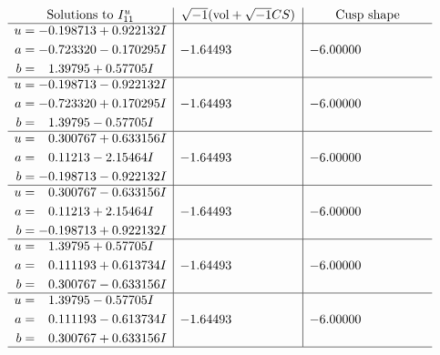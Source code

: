\documentclass[1p]{elsarticle_modified}
\theoremstyle{definition}
\newcommand{\I}{\sqrt{-1}}
\begin{document}
$$\begin{array}{c|c|c}  
\text{Solutions to }I^u_{11}& \I (\text{vol} + \sqrt{-1}CS) & \text{Cusp shape}\\
 \hline 
\begin{aligned}
u &= -0.198713 + 0.922132 I \\
a &= -0.723320 - 0.170295 I \\
b &= \phantom{-}1.39795 + 0.57705 I\end{aligned}
 & -1.64493\phantom{ +0.000000I} & -6.00000\phantom{ +0.000000I} \\ \hline\begin{aligned}
u &= -0.198713 - 0.922132 I \\
a &= -0.723320 + 0.170295 I \\
b &= \phantom{-}1.39795 - 0.57705 I\end{aligned}
 & -1.64493\phantom{ +0.000000I} & -6.00000\phantom{ +0.000000I} \\ \hline\begin{aligned}
u &= \phantom{-}0.300767 + 0.633156 I \\
a &= \phantom{-}0.11213 - 2.15464 I \\
b &= -0.198713 - 0.922132 I\end{aligned}
 & -1.64493\phantom{ +0.000000I} & -6.00000\phantom{ +0.000000I} \\ \hline\begin{aligned}
u &= \phantom{-}0.300767 - 0.633156 I \\
a &= \phantom{-}0.11213 + 2.15464 I \\
b &= -0.198713 + 0.922132 I\end{aligned}
 & -1.64493\phantom{ +0.000000I} & -6.00000\phantom{ +0.000000I} \\ \hline\begin{aligned}
u &= \phantom{-}1.39795 + 0.57705 I \\
a &= \phantom{-}0.111193 + 0.613734 I \\
b &= \phantom{-}0.300767 - 0.633156 I\end{aligned}
 & -1.64493\phantom{ +0.000000I} & -6.00000\phantom{ +0.000000I} \\ \hline\begin{aligned}
u &= \phantom{-}1.39795 - 0.57705 I \\
a &= \phantom{-}0.111193 - 0.613734 I \\
b &= \phantom{-}0.300767 + 0.633156 I\end{aligned}
 & -1.64493\phantom{ +0.000000I} & -6.00000\phantom{ +0.000000I}\\
 \hline 
 \end{array}$$\newpage\newpage\renewcommand{\arraystretch}{1}
\end{document}

